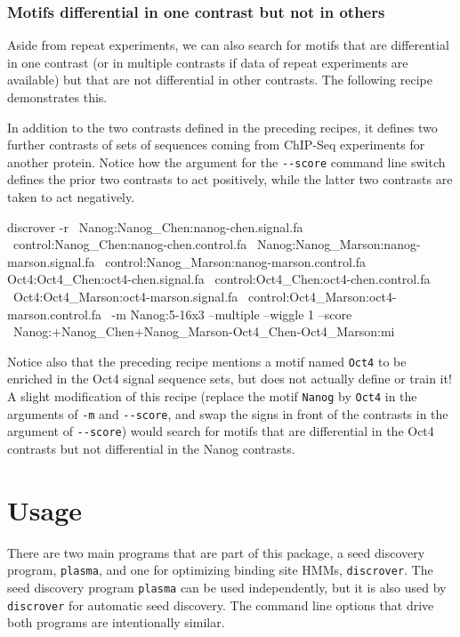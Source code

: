 \documentclass[a4paper]{article}
\newcommand{\plasma}[0]{\texttt{plasma}}
\newcommand{\discrover}[0]{\texttt{discrover}}
\begin{document}
\subsubsection{Motifs differential in one contrast but not in others}
Aside from repeat experiments, we can also search for motifs that are differential in one contrast (or in multiple contrasts if data of repeat experiments are available) but that are not differential in other contrasts.
The following recipe demonstrates this.

In addition to the two contrasts defined in the preceding recipes, it defines two further contrasts of sets of sequences coming from ChIP-Seq experiments for another protein.
Notice how the argument for the \verb|--score| command line switch defines the prior two contrasts to act positively, while the latter two contrasts are taken to act negatively.
\\
\begin{verbbox}
discrover -r \
Nanog:Nanog_Chen:nanog-chen.signal.fa \
control:Nanog_Chen:nanog-chen.control.fa \
Nanog:Nanog_Marson:nanog-marson.signal.fa \
control:Nanog_Marson:nanog-marson.control.fa
Oct4:Oct4_Chen:oct4-chen.signal.fa \
control:Oct4_Chen:oct4-chen.control.fa \
Oct4:Oct4_Marson:oct4-marson.signal.fa \
control:Oct4_Marson:oct4-marson.control.fa \
-m Nanog:5-16x3 --multiple --wiggle 1 --score \
Nanog:+Nanog_Chen+Nanog_Marson-Oct4_Chen-Oct4_Marson:mi
\end{verbbox}
\fbox{\theverbbox[t]}

Notice also that the preceding recipe mentions a motif named \verb|Oct4| to be enriched in the Oct4 signal sequence sets, but does not actually define or train it!
A slight modification of this recipe (replace the motif \verb|Nanog| by \verb|Oct4| in the arguments of \verb|-m| and \verb|--score|, and swap the signs in front of the contrasts in the argument of \verb|--score|) would search for motifs that are differential in the Oct4 contrasts but not differential in the Nanog contrasts.


\section{Usage}
There are two main programs that are part of this package, a seed discovery program, \plasma{}, and one for optimizing binding site HMMs, \discrover{}.
The seed discovery program \plasma{} can be used independently, but it is also used by \discrover{} for automatic seed discovery.
The command line options that drive both programs are intentionally similar.
\end{document}
